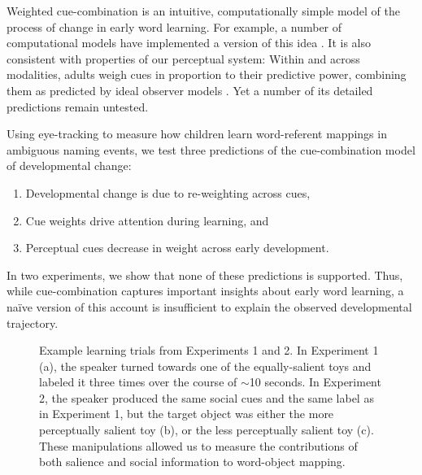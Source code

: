 \documentclass[man,floatsintext]{apa6}
\begin{document}
Weighted cue-combination is an intuitive, computationally simple model of the process of change in early word learning. For example, a number of computational models have implemented a version of this idea  \cite{Frank2007b,Frank2013a}. It is also consistent with properties of our perceptual system: Within and across modalities, adults weigh cues in proportion to their predictive power, combining them as predicted by ideal observer models \cite{Ernst2002, Jacobs2002}. Yet a number of its detailed predictions remain untested. 

Using eye-tracking to measure how children learn word-referent mappings in ambiguous naming events, we test three predictions of the cue-combination model of developmental change:

\begin{enumerate}[noitemsep]
	\item Developmental change is due to re-weighting across cues,
	\item Cue weights drive attention during learning, and
	\item Perceptual cues decrease in weight across early development.
\end{enumerate}

\noindent In two experiments, we show that none of these predictions is supported. Thus, while cue-combination captures important insights about early word learning, a na\"{i}ve version of this account is insufficient to explain the observed developmental trajectory.

\begin{figure}[tb]
	\caption{\label{fig:design} Example learning trials from Experiments 1 and 2. In Experiment 1 (a), the speaker turned towards one of the equally-salient toys and labeled it three times over the course of $\sim$10 seconds. In Experiment 2, the speaker produced the same social cues and the same label as in Experiment 1, but the target object was either the more perceptually salient toy (b), or the less perceptually salient toy (c). These manipulations allowed us to measure the contributions of both salience and social information to word-object mapping.}
\end{figure}
\end{document}
